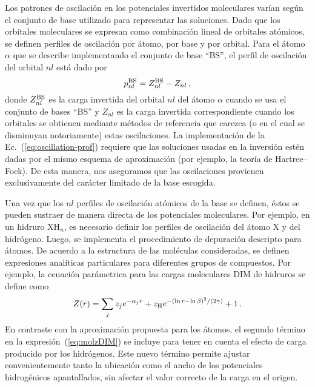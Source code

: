 Los patrones de oscilación en los potenciales invertidos moleculares 
varían según el conjunto de base utilizado para representar las 
soluciones. Dado que los orbitales moleculares se expresan como 
combinación lineal de orbitales atómicos, se definen perfiles de 
oscilación por átomo, por base y por orbital. Para el átomo $\alpha$ que 
se describe implementando el conjunto de base ``BS'', el perfil de 
oscilación del orbital $nl$ está dado por
\begin{equation}
 p_{nl}^{\mbox{\scriptsize BS}} = Z_{nl}^{\mbox{\scriptsize BS}}-
 Z_{nl} \,,
 \label{eq:oscillation-prof}
\end{equation}
donde $Z_{nl}^{\mbox{\scriptsize BS}}$ es la carga invertida del orbital
$nl$ del átomo $\alpha$ cuando se usa el conjunto de bases ``BS'' y 
$Z_{nl}$ es la carga invertida correspondiente cuando los orbitales se 
obtienen mediante métodos de referencia que carezca (o en el cual se 
disminuyan notoriamente) estas oscilaciones. La implementación de la 
Ec.~(\ref{eq:oscillation-prof}) requiere que las soluciones usadas en la 
inversión estén dadas por el mismo esquema de aproximación (por ejemplo, 
la teoría de Hartree--Fock). De esta manera, nos aseguramos que las 
oscilaciones provienen exclusivamente del carácter limitado de la base
escogida.

Una vez que los $nl$ perfiles de oscilación atómicos de la base se 
definen, éstos se pueden sustraer de manera directa de los potenciales 
moleculares. Por ejemplo, en un hidruro XH$_n$, es necesario definir los 
perfiles de oscilación del átomo X y del hidrógeno. Luego, se implementa 
el procedimiento de depuración descripto para átomos. De acuerdo a la 
estructura de las moléculas consideradas, se definen expresiones 
analíticas particulares para diferentes grupos de compuestos. Por 
ejemplo, la ecuación parámetrica para las cargas moleculares DIM de 
hidruros se define como
\begin{eqnarray}
 Z(r) = \sum_j z_j e^{-\alpha_j r} 
 + z_{\mbox{\scriptsize H}} e^{-(\ln r - \ln \beta)^2/(2\gamma)} 
 + 1\,.
 \label{eq:molzDIM}
\end{eqnarray}
En contraste con la aproximación propuesta para los átomos, el segundo 
término en la expresión~(\ref{eq:molzDIM}) se incluye para tener en 
cuenta el efecto de carga producido por los hidrógenos. Este nuevo 
término permite ajustar convenientemente tanto la ubicación como el 
ancho de los potenciales hidrogénicos apantallados, sin afectar el valor 
correcto de la carga en el origen.

